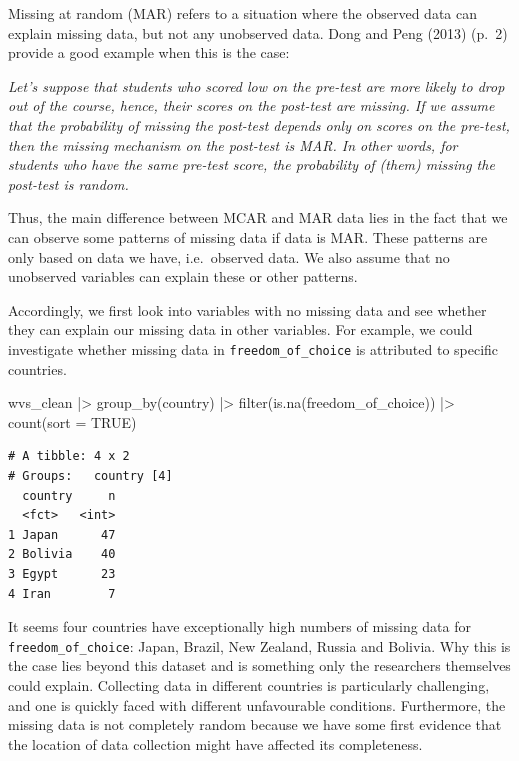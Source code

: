 \documentclass[
  letterpaper,
]{krantz}
\makeatletter
\newenvironment{Shaded}{\begin{snugshade}}{\end{snugshade}}
\newcommand{\AttributeTok}[1]{\textcolor[rgb]{0.40,0.45,0.13}{#1}}
\newcommand{\ConstantTok}[1]{\textcolor[rgb]{0.56,0.35,0.01}{#1}}
\newcommand{\FunctionTok}[1]{\textcolor[rgb]{0.28,0.35,0.67}{#1}}
\newcommand{\NormalTok}[1]{\textcolor[rgb]{0.00,0.23,0.31}{#1}}
\newcommand{\SpecialCharTok}[1]{\textcolor[rgb]{0.37,0.37,0.37}{#1}}
\renewenvironment{quote}{\begin{VF}}{\end{VF}}
\newenvironment{kframe}{%
\medskip{}
\setlength{\fboxsep}{.8em}
 \def\at@end@of@kframe{}%
 \ifinner\ifhmode%
  \def\at@end@of@kframe{\end{minipage}}%
  \begin{minipage}{\columnwidth}%
 \fi\fi%
 \def\FrameCommand##1{\hskip\@totalleftmargin \hskip-\fboxsep
 \colorbox{shadecolor}{##1}\hskip-\fboxsep
     \hskip-\linewidth \hskip-\@totalleftmargin \hskip\columnwidth}%
 \MakeFramed {\advance\hsize-\width
   \@totalleftmargin\z@ \linewidth\hsize
   \@setminipage}}%
 {\par\unskip\endMakeFramed%
 \at@end@of@kframe}
\renewenvironment{Shaded}{\begin{kframe}}{\end{kframe}}
\makeatother
\begin{document}
Missing at random (MAR) refers to a situation where the observed data
can explain missing data, but not any unobserved data. Dong and Peng
(2013) (p.~2) provide a good example when this is the case:

\begin{quote}
\emph{Let's suppose that students who scored low on the pre-test are
more likely to drop out of the course, hence, their scores on the
post-test are missing. If we assume that the probability of missing the
post-test depends only on scores on the pre-test, then the missing
mechanism on the post-test is MAR. In other words, for students who have
the same pre-test score, the probability of (them) missing the post-test
is random.}
\end{quote}

Thus, the main difference between MCAR and MAR data lies in the fact
that we can observe some patterns of missing data if data is MAR. These
patterns are only based on data we have, i.e.~observed data. We also
assume that no unobserved variables can explain these or other patterns.

Accordingly, we first look into variables with no missing data and see
whether they can explain our missing data in other variables. For
example, we could investigate whether missing data in
\texttt{freedom\_of\_choice} is attributed to specific countries.

\begin{Shaded}
\begin{Highlighting}[]
\NormalTok{wvs\_clean }\SpecialCharTok{|\textgreater{}}
  \FunctionTok{group\_by}\NormalTok{(country) }\SpecialCharTok{|\textgreater{}}
  \FunctionTok{filter}\NormalTok{(}\FunctionTok{is.na}\NormalTok{(freedom\_of\_choice)) }\SpecialCharTok{|\textgreater{}}
  \FunctionTok{count}\NormalTok{(}\AttributeTok{sort =} \ConstantTok{TRUE}\NormalTok{)}
\end{Highlighting}
\end{Shaded}

\begin{verbatim}
# A tibble: 4 x 2
# Groups:   country [4]
  country     n
  <fct>   <int>
1 Japan      47
2 Bolivia    40
3 Egypt      23
4 Iran        7
\end{verbatim}

It seems four countries have exceptionally high numbers of missing data
for \texttt{freedom\_of\_choice}: Japan, Brazil, New Zealand, Russia and
Bolivia. Why this is the case lies beyond this dataset and is something
only the researchers themselves could explain. Collecting data in
different countries is particularly challenging, and one is quickly
faced with different unfavourable conditions. Furthermore, the missing
data is not completely random because we have some first evidence that
the location of data collection might have affected its completeness.
\end{document}
